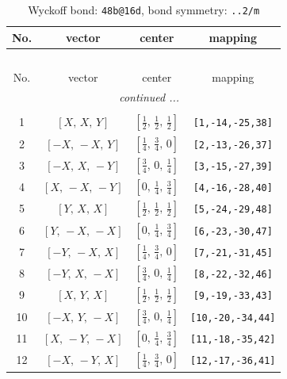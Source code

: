 \documentclass[fleqn,8pt]{jsarticle}
\begin{document}
\renewcommand{\arraystretch}{1.2}
\begin{longtable}{cccc}
\caption{Wyckoff bond: {\tt 48b@16d}, bond symmetry: {\tt ..2/m}}
 \\
 \hline \hline
No. & vector & center & mapping \\ \hline \endfirsthead

\multicolumn{3}{l}{\tablename\ \thetable{}} \\
 \hline \hline
No. & vector & center & mapping \\ \hline \endhead

 \hline \hline
\multicolumn{3}{r}{\footnotesize\it continued ...} \\ \endfoot

 \hline \hline
\multicolumn{3}{r}{} \\ \endlastfoot

1 & $\left[ X,\, X,\, Y \right]$ & $\left[ \frac{1}{2},\, \frac{1}{2},\, \frac{1}{2} \right]$ & {\tt [1,-14,-25,38]} \\ \hline
2 & $\left[ - X,\, - X,\, Y \right]$ & $\left[ \frac{1}{4},\, \frac{3}{4},\, 0 \right]$ & {\tt [2,-13,-26,37]} \\ \hline
3 & $\left[ - X,\, X,\, - Y \right]$ & $\left[ \frac{3}{4},\, 0,\, \frac{1}{4} \right]$ & {\tt [3,-15,-27,39]} \\ \hline
4 & $\left[ X,\, - X,\, - Y \right]$ & $\left[ 0,\, \frac{1}{4},\, \frac{3}{4} \right]$ & {\tt [4,-16,-28,40]} \\ \hline
5 & $\left[ Y,\, X,\, X \right]$ & $\left[ \frac{1}{2},\, \frac{1}{2},\, \frac{1}{2} \right]$ & {\tt [5,-24,-29,48]} \\ \hline
6 & $\left[ Y,\, - X,\, - X \right]$ & $\left[ 0,\, \frac{1}{4},\, \frac{3}{4} \right]$ & {\tt [6,-23,-30,47]} \\ \hline
7 & $\left[ - Y,\, - X,\, X \right]$ & $\left[ \frac{1}{4},\, \frac{3}{4},\, 0 \right]$ & {\tt [7,-21,-31,45]} \\ \hline
8 & $\left[ - Y,\, X,\, - X \right]$ & $\left[ \frac{3}{4},\, 0,\, \frac{1}{4} \right]$ & {\tt [8,-22,-32,46]} \\ \hline
9 & $\left[ X,\, Y,\, X \right]$ & $\left[ \frac{1}{2},\, \frac{1}{2},\, \frac{1}{2} \right]$ & {\tt [9,-19,-33,43]} \\ \hline
10 & $\left[ - X,\, Y,\, - X \right]$ & $\left[ \frac{3}{4},\, 0,\, \frac{1}{4} \right]$ & {\tt [10,-20,-34,44]} \\ \hline
11 & $\left[ X,\, - Y,\, - X \right]$ & $\left[ 0,\, \frac{1}{4},\, \frac{3}{4} \right]$ & {\tt [11,-18,-35,42]} \\ \hline
12 & $\left[ - X,\, - Y,\, X \right]$ & $\left[ \frac{1}{4},\, \frac{3}{4},\, 0 \right]$ & {\tt [12,-17,-36,41]} \\
\end{longtable}
\end{document}
